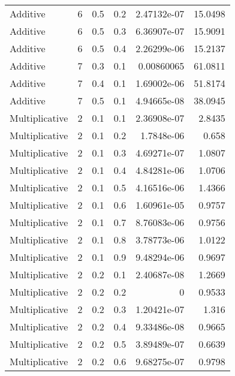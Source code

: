 \documentclass{article}
\begin{document}
\begin{longtable}[H]{lrrrrr}
 Additive       &       6 &   0.5 &            0.2 &   2.47132e-07 &         15.0498 \\
 Additive       &       6 &   0.5 &            0.3 &   6.36907e-07 &         15.9091 \\
 Additive       &       6 &   0.5 &            0.4 &   2.26299e-06 &         15.2137 \\
 Additive       &       7 &   0.3 &            0.1 &   0.00860065  &         61.0811 \\
 Additive       &       7 &   0.4 &            0.1 &   1.69002e-06 &         51.8174 \\
 Additive       &       7 &   0.5 &            0.1 &   4.94665e-08 &         38.0945 \\
 Multiplicative &       2 &   0.1 &            0.1 &   2.36908e-07 &          2.8435 \\
 Multiplicative &       2 &   0.1 &            0.2 &   1.7848e-06  &          0.658  \\
 Multiplicative &       2 &   0.1 &            0.3 &   4.69271e-07 &          1.0807 \\
 Multiplicative &       2 &   0.1 &            0.4 &   4.84281e-06 &          1.0706 \\
 Multiplicative &       2 &   0.1 &            0.5 &   4.16516e-06 &          1.4366 \\
 Multiplicative &       2 &   0.1 &            0.6 &   1.60961e-05 &          0.9757 \\
 Multiplicative &       2 &   0.1 &            0.7 &   8.76083e-06 &          0.9756 \\
 Multiplicative &       2 &   0.1 &            0.8 &   3.78773e-06 &          1.0122 \\
 Multiplicative &       2 &   0.1 &            0.9 &   9.48294e-06 &          0.9697 \\
 Multiplicative &       2 &   0.2 &            0.1 &   2.40687e-08 &          1.2669 \\
 Multiplicative &       2 &   0.2 &            0.2 &   0           &          0.9533 \\
 Multiplicative &       2 &   0.2 &            0.3 &   1.20421e-07 &          1.316  \\
 Multiplicative &       2 &   0.2 &            0.4 &   9.33486e-08 &          0.9665 \\
 Multiplicative &       2 &   0.2 &            0.5 &   3.89489e-07 &          0.6639 \\
 Multiplicative &       2 &   0.2 &            0.6 &   9.68275e-07 &          0.9798 \\

\end{longtable}
\end{document}
